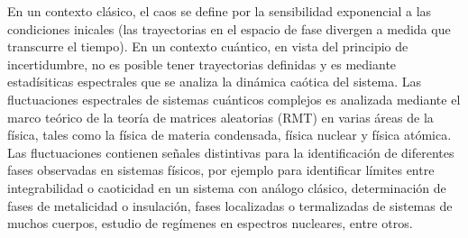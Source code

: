 \documentclass[spanish,titlepage,table]{practicas}
\begin{document}
En un contexto clásico, el caos se define por la sensibilidad exponencial a las condiciones inicales 
(las trayectorias en el espacio de fase divergen a medida que transcurre el tiempo). En un contexto cuántico, en vista del principio de incertidumbre, no es posible tener 
trayectorias definidas y es mediante estadísiticas espectrales que se analiza la dinámica caótica del sistema.
Las fluctuaciones espectrales de sistemas cuánticos complejos es analizada mediante 
el marco teórico de la teoría de matrices aleatorias (RMT) en varias áreas de la física, 
tales como la física de materia condensada, física nuclear y física atómica.
Las fluctuaciones contienen señales distintivas para la identificación de diferentes fases observadas 
en sistemas físicos, por ejemplo para identificar límites entre integrabilidad o caoticidad en un sistema con análogo clásico,
determinación de fases de metalicidad o insulación, fases localizadas o termalizadas de sistemas de muchos cuerpos, estudio de regímenes en espectros nucleares, entre otros. \cite{Tekur2020} 
\end{document}
